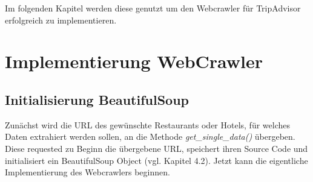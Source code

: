 \documentclass[a4paper,oneside,12pt]{report}
\begin{document}
			Im folgenden Kapitel werden diese genutzt um den Webcrawler für TripAdvisor erfolgreich zu implementieren.
	
	
		\section{Implementierung WebCrawler}
	
	
			\subsection{Initialisierung BeautifulSoup}
			
				Zunächst wird die URL des gewünschte Restaurants oder Hotels, für welches Daten extrahiert werden sollen, an die Methode \textit{get\_single\_data()} übergeben. Diese requested zu Beginn die übergebene URL, speichert ihren Source Code und initialisiert ein BeautifulSoup Object (vgl. Kapitel 4.2). Jetzt kann die eigentliche Implementierung des Webcrawlers beginnen. 
	
\end{document}
